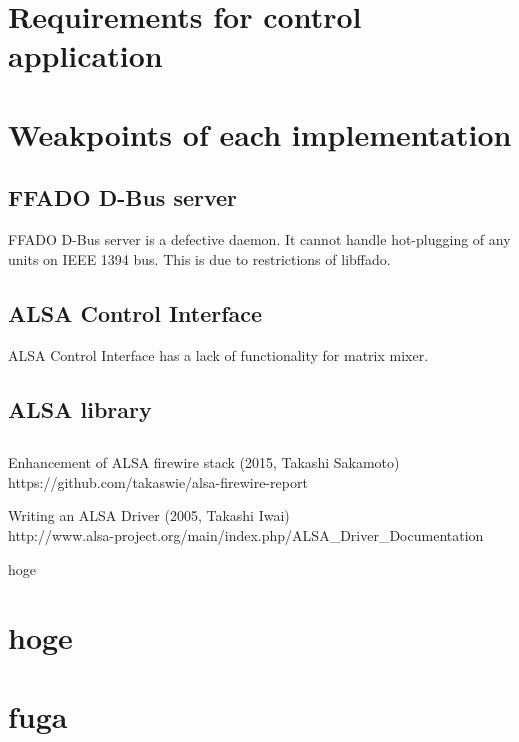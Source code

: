 \documentclass[onecolumn]{article}
\begin{document}
\section{Requirements for control application}

\section{Weakpoints of each implementation}

\subsection{FFADO D-Bus server}

FFADO D-Bus server is a defective daemon. It cannot handle hot-plugging of any units on IEEE 1394 bus. This is due to restrictions of libffado.

\subsection{ALSA Control Interface}

ALSA Control Interface has a lack of functionality for matrix mixer.

\subsection{ALSA library}



\subsection{}
\subsection{}

\newpage

\begin{thebibliography}{99}


Enhancement of ALSA firewire stack (2015, Takashi Sakamoto) \\
https://github.com/takaswie/alsa-firewire-report

Writing an ALSA Driver (2005, Takashi Iwai) \\
http://www.alsa-project.org/main/index.php/ALSA\_Driver\_Documentation

hoge

\end{thebibliography}

\newpage

\appendix


\section{hoge}

\section{fuga}
\end{document}
